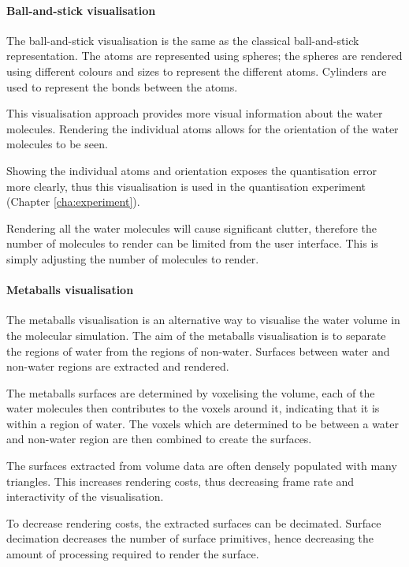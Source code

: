 
\paragraph{Ball-and-stick visualisation}

The ball-and-stick visualisation is the same as the classical ball-and-stick
representation. The atoms are represented using spheres; the spheres are
rendered using different colours and sizes to represent the different atoms.
Cylinders are used to represent the bonds between the atoms.

This visualisation approach provides more visual information about the water
molecules.  Rendering the individual atoms allows for the orientation of the
water molecules to be seen.

Showing the individual atoms and orientation exposes the quantisation error
more clearly, thus this visualisation is used in the quantisation experiment
(Chapter \ref{cha:experiment}).

Rendering all the water molecules will cause significant clutter, therefore the
number of molecules to render can be limited from the user interface. This is
simply adjusting the number of molecules to render.


\paragraph{Metaballs visualisation}

The metaballs visualisation is an alternative way to visualise the water volume
in the molecular simulation. The aim of the metaballs visualisation is to
separate the regions of water from the regions of non-water. Surfaces between
water and non-water regions are extracted and rendered.

The metaballs surfaces are determined by voxelising the volume, each of the
water molecules then contributes to the voxels around it, indicating that it is
within a region of water. The voxels which are determined to be between a water
and non-water region are then combined to create the surfaces.

The surfaces extracted from volume data are often densely populated with many
triangles. This increases rendering costs, thus decreasing frame rate and
interactivity of the visualisation.

To decrease rendering costs, the extracted surfaces can be decimated. Surface
decimation decreases the number of surface primitives, hence decreasing the
amount of processing required to render the surface.

